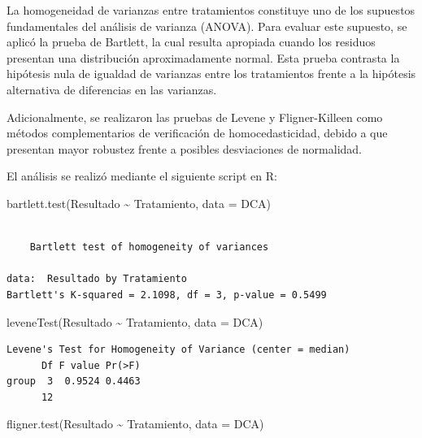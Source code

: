 \documentclass[
  spanish,
  letterpaper,
  DIV=11,
  numbers=noendperiod]{scrreprt}
\newenvironment{Shaded}{\begin{snugshade}}{\end{snugshade}}
\newcommand{\AttributeTok}[1]{\textcolor[rgb]{0.40,0.45,0.13}{#1}}
\newcommand{\FunctionTok}[1]{\textcolor[rgb]{0.28,0.35,0.67}{#1}}
\newcommand{\NormalTok}[1]{\textcolor[rgb]{0.00,0.23,0.31}{#1}}
\newcommand{\SpecialCharTok}[1]{\textcolor[rgb]{0.37,0.37,0.37}{#1}}
\begin{document}
La homogeneidad de varianzas entre tratamientos constituye uno de los
supuestos fundamentales del análisis de varianza (ANOVA). Para evaluar
este supuesto, se aplicó la prueba de Bartlett, la cual resulta
apropiada cuando los residuos presentan una distribución aproximadamente
normal. Esta prueba contrasta la hipótesis nula de igualdad de varianzas
entre los tratamientos frente a la hipótesis alternativa de diferencias
en las varianzas.

Adicionalmente, se realizaron las pruebas de Levene y Fligner-Killeen
como métodos complementarios de verificación de homocedasticidad, debido
a que presentan mayor robustez frente a posibles desviaciones de
normalidad.

El análisis se realizó mediante el siguiente script en R:

\begin{Shaded}
\begin{Highlighting}[]
\FunctionTok{bartlett.test}\NormalTok{(Resultado }\SpecialCharTok{\textasciitilde{}}\NormalTok{ Tratamiento, }\AttributeTok{data =}\NormalTok{ DCA)}
\end{Highlighting}
\end{Shaded}

\begin{verbatim}

    Bartlett test of homogeneity of variances

data:  Resultado by Tratamiento
Bartlett's K-squared = 2.1098, df = 3, p-value = 0.5499
\end{verbatim}

\begin{Shaded}
\begin{Highlighting}[]
\FunctionTok{leveneTest}\NormalTok{(Resultado }\SpecialCharTok{\textasciitilde{}}\NormalTok{ Tratamiento, }\AttributeTok{data =}\NormalTok{ DCA)}
\end{Highlighting}
\end{Shaded}

\begin{verbatim}
Levene's Test for Homogeneity of Variance (center = median)
      Df F value Pr(>F)
group  3  0.9524 0.4463
      12               
\end{verbatim}

\begin{Shaded}
\begin{Highlighting}[]
\FunctionTok{fligner.test}\NormalTok{(Resultado }\SpecialCharTok{\textasciitilde{}}\NormalTok{ Tratamiento, }\AttributeTok{data =}\NormalTok{ DCA)}
\end{Highlighting}
\end{Shaded}
\end{document}
